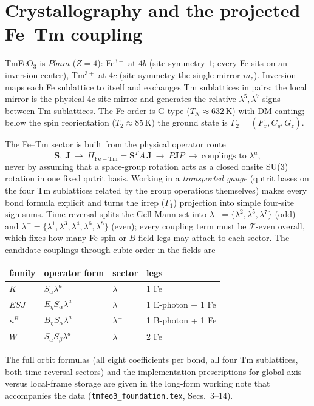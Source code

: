 \documentclass[11pt]{article}
\newcommand{\Fe}{\mathrm{Fe}}
\newcommand{\Tm}{\mathrm{Tm}}
\newcommand{\ve}[1]{\boldsymbol{#1}}
\begin{document}
\section{Crystallography and the projected Fe--Tm coupling}
\label{si:crystal}

TmFeO$_3$ is $Pbnm$ ($Z=4$): Fe$^{3+}$ at $4b$ (site symmetry $\bar1$;
every Fe sits on an inversion center), Tm$^{3+}$ at $4c$ (site symmetry
the single mirror $m_z$).  Inversion maps each Fe sublattice to itself
and exchanges Tm sublattices in pairs; the local mirror is the physical
$4c$ site mirror and generates the relative $\lambda^5,\lambda^7$ signs
between Tm sublattices.  The Fe order is G-type
($T_N\approx632$\,K) with DM canting; below the spin reorientation
($T_2\approx85$\,K) the ground state is $\Gamma_2=(F_x,C_y,G_z)$.

The Fe--Tm sector is built from the physical operator route
\begin{equation}
  \ve S,\ \ve J\ \longrightarrow\ H_{\Fe-\Tm}=\ve S^TA\,\ve J
  \ \longrightarrow\ P\ve JP
  \ \longrightarrow\ \text{couplings to }\lambda^a ,
\end{equation}
never by assuming that a space-group rotation acts as a closed onsite
SU(3) rotation in one fixed qutrit basis.  Working in a
\emph{transported gauge} (qutrit bases on the four Tm sublattices related
by the group operations themselves) makes every bond formula explicit and
turns the irrep ($\Gamma_1$) projection into simple four-site sign sums.
Time-reversal splits the Gell-Mann set into
$\lambda^-=\{\lambda^2,\lambda^5,\lambda^7\}$ (odd) and
$\lambda^+=\{\lambda^1,\lambda^3,\lambda^4,\lambda^6,\lambda^8\}$ (even);
every coupling term must be $\mathcal T$-even overall, which fixes how
many Fe-spin or $B$-field legs may attach to each sector.  The candidate
couplings through cubic order in the fields are
\begin{center}
\renewcommand{\arraystretch}{1.25}
\begin{tabular}{llll}
\toprule
family & operator form & sector & legs \\
\midrule
$K^-$ & $S_\alpha\lambda^a$ & $\lambda^-$ & 1 Fe \\
$ESJ$ & $E_\eta S_\alpha\lambda^a$ & $\lambda^-$ & 1 E-photon + 1 Fe \\
$\kappa^B$ & $B_\eta S_\alpha\lambda^a$ & $\lambda^+$ & 1 B-photon + 1 Fe \\
$W$ & $S_\alpha S_\beta\lambda^a$ & $\lambda^+$ & 2 Fe \\
\bottomrule
\end{tabular}
\end{center}
The full orbit formulas (all eight coefficients per bond, all four Tm
sublattices, both time-reversal sectors) and the implementation
prescriptions for global-axis versus local-frame storage are given in the
long-form working note that accompanies the data
(\texttt{tmfeo3\_foundation.tex}, Secs.~3--14).
\end{document}
